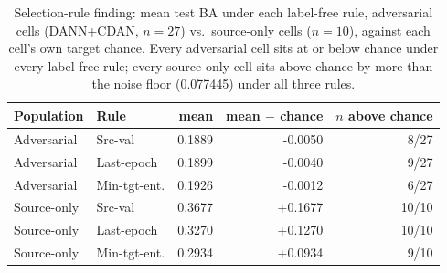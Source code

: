 \begin{table}[t]
\centering
\caption{Selection-rule finding: mean test BA under each label-free rule, adversarial cells (DANN+CDAN, $n{=}27$) vs.\ source-only cells ($n{=}10$), against each cell's own target chance. Every adversarial cell sits at or below chance under every label-free rule; every source-only cell sits above chance by more than the noise floor (0.077445) under all three rules.}
\label{tab:selection_rule_finding}
\footnotesize
\begin{tabular}{llrrr}
\toprule
Population & Rule & mean & mean $-$ chance & $n$ above chance \\
\midrule
Adversarial & Src-val & 0.1889 & -0.0050 & 8/27 \\
Adversarial & Last-epoch & 0.1899 & -0.0040 & 9/27 \\
Adversarial & Min-tgt-ent. & 0.1926 & -0.0012 & 6/27 \\
\midrule
Source-only & Src-val & 0.3677 & +0.1677 & 10/10 \\
Source-only & Last-epoch & 0.3270 & +0.1270 & 10/10 \\
Source-only & Min-tgt-ent. & 0.2934 & +0.0934 & 9/10 \\
\bottomrule
\end{tabular}
\end{table}
